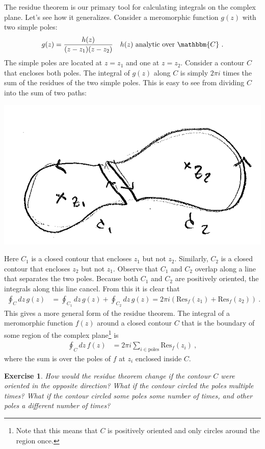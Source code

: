 \documentclass[
  11pt,
	colorful,
	raggedright,
]{tufte-style-thesis-flip}
\newtheorem{exercise}{Exercise}[section]
\begin{document}
The residue theorem is our primary tool for calculating integrals on the complex plane. Let's see how it generalizes. Consider a meromorphic function $g(z)$ with two simple poles:
\begin{align}
  g(z) &= \frac{h(z)}{(z-z_1)(z-z_2)} 
  &
  h(z) \text{ analytic over }\mathbbm{C} \ .
\end{align}
The simple poles are located at $z=z_1$ and one at $z=z_2$. Consider a contour $C$ that encloses both poles. The integral of $g(z)$ along $C$ is simply $2\pi i$ times the sum of the residues of the two simple poles. This is easy to see from dividing $C$ into the sum of two paths:
\begin{center}
\includegraphics[width=.5\textwidth]{figures/Lec_2017_13_2poles.png}
\end{center}
Here $C_1$ is a closed contour that encloses $z_1$ but not $z_2$. Similarly, $C_2$ is a closed contour that encloses $z_2$ but not $z_1$. Observe that $C_1$ and $C_2$ overlap along a line that separates the two poles. Because both $C_1$ and $C_2$ are positively oriented, the integrals along this line cancel. From this it is clear that
\begin{align}
  \oint_C dz\, g(z) &=
  \oint_{C_1} dz\, g(z) 
  +
  \oint_{C_2} dz\, g(z)
  = 2\pi i\left(\text{Res}_f(z_1) + \text{Res}_f(z_2)\right) \ .
\end{align}
This gives a more general form of the residue theorem. The integral of a meromorphic function $f(z)$ around a closed contour $C$ that is the boundary of some region of the complex plane\footnote{Note that this means that $C$ is positively oriented and only circles around the region once.} is
\begin{align}
  \oint_C dz\, f(z) &= 2\pi i \sum_{i\in \text{poles}} \text{Res}_f(z_i) \ ,
\end{align}
where the sum is over the poles of $f$ at $z_i$ enclosed inside $C$.
\begin{exercise}
How would the residue theorem change if the contour $C$ were oriented in the opposite direction? What if the contour circled the poles multiple times? What if the contour circled some poles some number of times, and other poles a different number of times?
\end{exercise}
\end{document}
